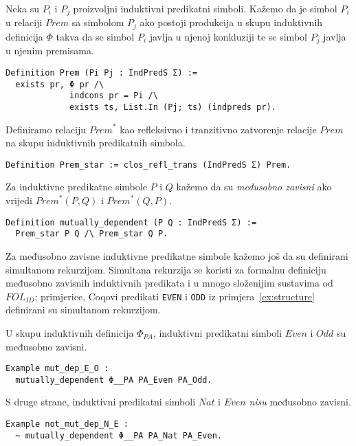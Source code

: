 \begin{definition}
  Neka su \(P_{i}\) i \(P_{j}\) proizvoljni induktivni predikatni simboli.
  Kažemo da je simbol \(P_{i}\) u relaciji \(\mathit{Prem}\) sa simbolom \(P_{j}\)
  ako postoji produkcija u skupu induktivnih definicija \(\Phi\) takva da
  se simbol \(P_{i}\) javlja u njenoj konkluziji te
  se simbol \(P_{j}\) javlja u njenim premisama.
\begin{verbatim}
Definition Prem (Pi Pj : IndPredS Σ) :=
  exists pr, Φ pr /\
             indcons pr = Pi /\
             exists ts, List.In (Pj; ts) (indpreds pr).
\end{verbatim}
\end{definition}
\pagebreak
\begin{definition}
  Definiramo relaciju \(\mathit{Prem}^{\ast}\) kao refleksivno i tranzitivno zatvorenje relacije \(\mathit{Prem}\) na skupu induktivnih predikatnih simbola.
\begin{verbatim}
Definition Prem_star := clos_refl_trans (IndPredS Σ) Prem.
\end{verbatim}
  \noindent Za induktivne predikatne simbole \(P\) i \(Q\) kažemo da su
  \textit{međusobno zavisni} ako vrijedi \(\mathit{Prem}^{\ast}(P, Q)\) i \(\mathit{Prem}^{\ast}(Q, P)\).
\begin{verbatim}
Definition mutually_dependent (P Q : IndPredS Σ) :=
  Prem_star P Q /\ Prem_star Q P.
\end{verbatim}
  \noindent Za međusobno zavisne induktivne predikatne simbole kažemo još da su
  definirani simultanom rekurzijom.
  Simultana rekurzija se koristi za formalnu definiciju međusobno zavisnih induktivnih predikata
  i u mnogo složenijim sustavima od \(\mathit{FOL}_{\mathit{ID}}\); primjerice,
  Coqovi predikati \texttt{EVEN} i \texttt{ODD} iz primjera~\ref{ex:structure}
  definirani su simultanom rekurzijom.
\end{definition}

\begin{example}
  U skupu induktivnih definicija \(\Phi_{\mathit{PA}}\),
  induktivni predikatni simboli \(\mathit{Even}\) i \(\mathit{Odd}\)
  su međusobno zavisni.
\begin{verbatim}
Example mut_dep_E_O :
  mutually_dependent Φ__PA PA_Even PA_Odd.
\end{verbatim}
  \noindent S druge strane, induktivni predikatni simboli \(\mathit{Nat}\) i \(\mathit{Even}\)
  \textit{nisu} međusobno zavisni.
\begin{verbatim}
Example not_mut_dep_N_E :
  ~ mutually_dependent Φ__PA PA_Nat PA_Even.
\end{verbatim}
\end{example}


